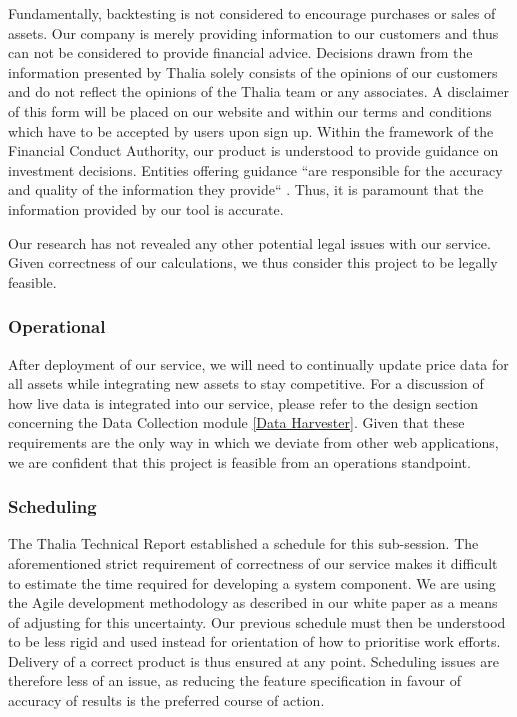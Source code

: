 \documentclass[main.tex]{subfiles}
\begin{document}
Fundamentally, backtesting is not considered to encourage purchases or sales of assets. Our company is merely providing information to our customers and thus can not be considered to provide financial advice. Decisions drawn from the information presented by Thalia solely consists of the opinions of our customers and do not reflect the opinions of the Thalia team or any associates. A disclaimer of this form will be placed on our website and within our terms and conditions which have to be accepted by users upon sign up.
Within the framework of the Financial Conduct Authority, our product is understood to provide guidance on investment decisions. Entities offering guidance ``are responsible for the accuracy and quality of the information they provide`` \cite{fca_guidance_advice}. Thus, it is paramount that the information provided by our tool is accurate.

Our research has not revealed any other potential legal issues with our service. Given correctness of our calculations, we thus consider this project to be legally feasible.

\subsubsection{Operational}

After deployment of our service, we will need to continually update price data for all assets while integrating new assets to stay competitive. For a discussion of how live data is integrated into our service, please refer to the design section concerning the Data Collection module \ref{Data Harvester}. Given that these requirements are the only way in which we deviate from other web applications, we are confident that this project is feasible from an operations standpoint.

\subsubsection{Scheduling}

The Thalia Technical Report established a schedule for this sub-session. The aforementioned strict requirement of correctness of our service makes it difficult to estimate the time required for developing a system component. We are using the Agile development methodology as described in our white paper \cite{WP} as a means of adjusting for this uncertainty. Our previous schedule must then be understood to be less rigid and used instead for orientation of how to prioritise work efforts. Delivery of a correct product is thus ensured at any point. Scheduling issues are therefore less of an issue, as reducing the feature specification in favour of accuracy of results is the preferred course of action.
\end{document}
